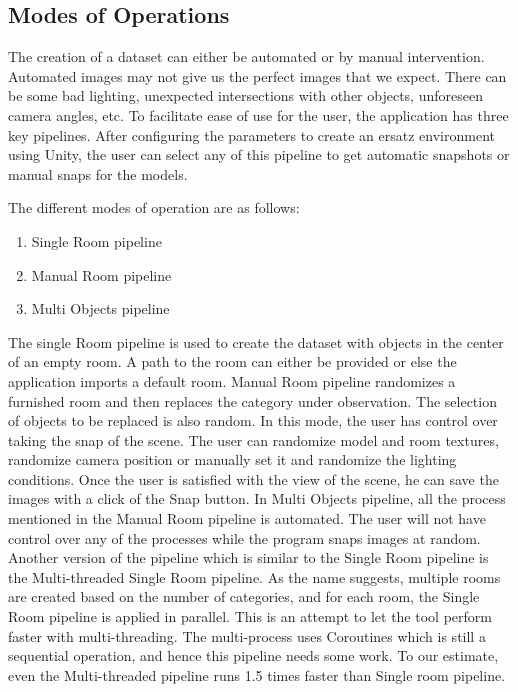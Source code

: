 \subsection{Modes of Operations}\label{subsec:modes-of-operations}
The creation of a dataset can either be automated or by manual intervention.
Automated images may not give us the perfect images that we expect.
There can be some bad lighting, unexpected intersections with other objects, unforeseen camera angles, etc.
To facilitate ease of use for the user, the application has three key pipelines.
After configuring the parameters to create an ersatz environment using Unity,
the user can select any of this pipeline to get automatic snapshots or manual snaps for the models.

The different modes of operation are as follows:
\begin{enumerate}
    \item Single Room pipeline
    \item Manual Room pipeline
    \item Multi Objects pipeline
\end{enumerate}

The single Room pipeline is used to create the dataset with objects in the center of an empty room.
A path to the room can either be provided or else the application imports a default room.
Manual Room pipeline randomizes a furnished room and then replaces the category under observation.
The selection of objects to be replaced is also random.
In this mode, the user has control over taking the snap of the scene.
The user can randomize model and room textures, randomize camera position or manually set it and randomize the lighting conditions.
Once the user is satisfied with the view of the scene, he can save the images with a click of the Snap button.
In Multi Objects pipeline, all the process mentioned in the Manual Room pipeline is automated.
The user will not have control over any of the processes while the program snaps images at random.
Another version of the pipeline which is similar to the Single Room pipeline is the Multi-threaded Single Room pipeline.
As the name suggests, multiple rooms are created based on the number of categories, and for each room, the Single Room pipeline is applied in parallel.
This is an attempt to let the tool perform faster with multi-threading.
The multi-process uses Coroutines which is still a sequential operation, and hence this pipeline needs some work.
To our estimate, even the Multi-threaded pipeline runs 1.5 times faster than Single room pipeline.

